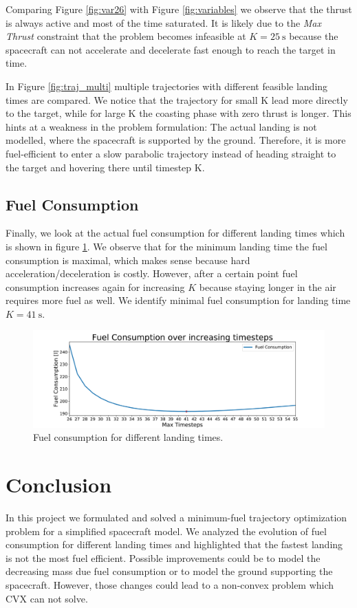 \documentclass[12pt, letterpaper]{article}
\begin{document}
Comparing Figure \ref{fig:var26} with Figure \ref{fig:variables} we observe that the thrust is always active and most of the time saturated.
It is likely due to the \textit{Max Thrust} constraint that the problem becomes infeasible at $K=\SI{25}{\second}$ because the spacecraft can not accelerate and decelerate fast enough to reach the target in time.

In Figure \ref{fig:traj_multi} multiple trajectories with different feasible landing times are compared.
We notice that the trajectory for small K lead more directly to the target, while for large K the coasting phase with zero thrust is longer.
This hints at a weakness in the problem formulation: The actual landing is not modelled, where the spacecraft is supported by the ground.
Therefore, it is more fuel-efficient to enter a slow parabolic trajectory instead of heading straight to the target and hovering there until timestep K.

\subsection{Fuel Consumption}
Finally, we look at the actual fuel consumption for different landing times which is shown in figure \ref{fig:fuelconsump}.
We observe that for the minimum landing time the fuel consumption is maximal, which makes sense because hard acceleration/deceleration is costly.
However, after a certain point fuel consumption increases again for increasing $K$ because staying longer in the air requires more fuel as well.
We identify minimal fuel consumption for landing time $K=\SI{41}{\second}$.

\begin{figure}[H]
 \centering 
 \includegraphics[width=12cm]{fuelcomsumption.pdf}
   \caption{Fuel consumption for different landing times.}
  \label{fig:fuelconsump}
\end{figure}

\section{Conclusion}
In this project we formulated and solved a minimum-fuel trajectory optimization problem for a simplified spacecraft model.
We analyzed the evolution of fuel consumption for different landing times and highlighted that the fastest landing is not the most fuel efficient.
Possible improvements could be to model the decreasing mass due fuel consumption or to model the ground supporting the spacecraft.
However, those changes could lead to a non-convex problem which CVX can not solve.
\end{document}
